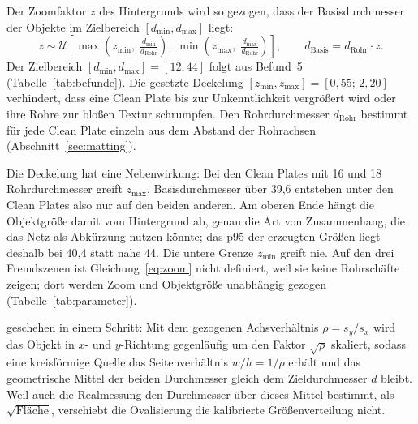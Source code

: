 \label{sec:modellentscheidungen} Der Zoomfaktor $z$
des Hintergrunds wird so gezogen, dass der Basisdurchmesser der Objekte im
Zielbereich $[d_{\min}, d_{\max}]$ liegt:
\begin{equation}
z \sim \mathcal{U}\!\left[\max\!\left(z_{\min},\;
\tfrac{d_{\min}}{d_{\text{Rohr}}}\right),\;
\min\!\left(z_{\max},\;\tfrac{d_{\max}}{d_{\text{Rohr}}}\right)\right],
\qquad d_{\text{Basis}} = d_{\text{Rohr}} \cdot z .
\label{eq:zoom}
\end{equation}
Der Zielbereich $[d_{\min}, d_{\max}] = [12, 44]$\px{} folgt aus Befund~5
(Tabelle~\ref{tab:befunde}). Die gesetzte Deckelung
$[z_{\min}, z_{\max}] = [0{,}55;\,2{,}20]$ verhindert, dass eine Clean Plate bis
zur Unkenntlichkeit vergrößert wird oder ihre Rohre zur bloßen Textur
schrumpfen. Den Rohrdurchmesser $d_{\text{Rohr}}$ bestimmt
 für jede Clean Plate einzeln aus dem Abstand der
Rohrachsen (Abschnitt~\ref{sec:matting}).

Die Deckelung hat eine Nebenwirkung: Bei den Clean Plates mit 16 und 18\px{}
Rohrdurchmesser greift $z_{\max}$, Basisdurchmesser über 39,6\px{} entstehen
unter den Clean Plates also nur auf den beiden anderen. Am oberen Ende hängt
die Objektgröße damit vom Hintergrund ab, genau die Art von Zusammenhang, die
das Netz als Abkürzung nutzen könnte; das p95 der erzeugten Größen liegt
deshalb bei 40,4 statt nahe 44\px. Die untere Grenze $z_{\min}$ greift nie. Auf
den drei Fremdszenen ist Gleichung~\eqref{eq:zoom} nicht definiert, weil sie
keine Rohrschäfte zeigen; dort werden Zoom und Objektgröße unabhängig gezogen
(Tabelle~\ref{tab:parameter}).

 geschehen in einem Schritt: Mit dem
gezogenen Achsverhältnis $\rho = s_y/s_x$ wird das Objekt in $x$- und
$y$-Richtung gegenläufig um den Faktor $\sqrt{\rho}$ skaliert, sodass eine
kreisförmige Quelle das Seitenverhältnis $w/h = 1/\rho$ erhält und das
geometrische Mittel der beiden Durchmesser gleich dem Zieldurchmesser $d$
bleibt. Weil auch die Realmessung den Durchmesser über dieses Mittel bestimmt,
als $\sqrt{\text{Fläche}}$, verschiebt die Ovalisierung die kalibrierte
Größenverteilung nicht.

